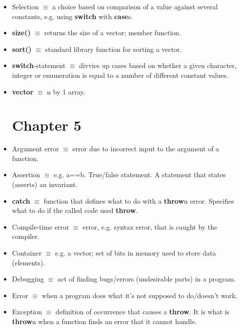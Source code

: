 \documentclass[12pt]{article}
\begin{document}
\begin{itemize}
\item Selection $\equiv$ a choice based on comparison of a value against several constants, e.g. using \textbf{switch} with \textbf{case}s.

\item \textbf{size()} $\equiv$ returns the size of a vector; member function.

\item \textbf{sort()} $\equiv$ standard library function for sorting a vector.

\item \textbf{switch}-statement $\equiv$ divvies up cases based on whether a given character, integer or enumeration is equal to a number of different constant values.

\item \textbf{vector} $\equiv$ n by 1 array.

\section*{Chapter 5}

\item Argument error $\equiv$ error due to incorrect input to the argument of a function.

\item Assertion $\equiv$ e.g. a==b. True/false statement. A statement that states (asserts) an invariant.

\item \textbf{catch} $\equiv$ function that defines what to do with a \textbf{throw}n error. Specifies what to do if the called code used \textbf{throw}.

\item Compile-time error $\equiv$ error, e.g. syntax error, that is caught by the compiler.

\item Container $\equiv$ e.g. a vector; set of bits in memory used to store data (elements).

\item Debugging $\equiv$ act of finding bugs/errors (undesirable parts) in a program.

\item Error $\equiv$ when a program does what it's not supposed to do/doesn't work.

\item Exception $\equiv$ definition of occurrence that causes a \textbf{throw}. It is what is \textbf{throw}n when a function finds an error that it cannot handle.


\end{itemize}
\end{document}
